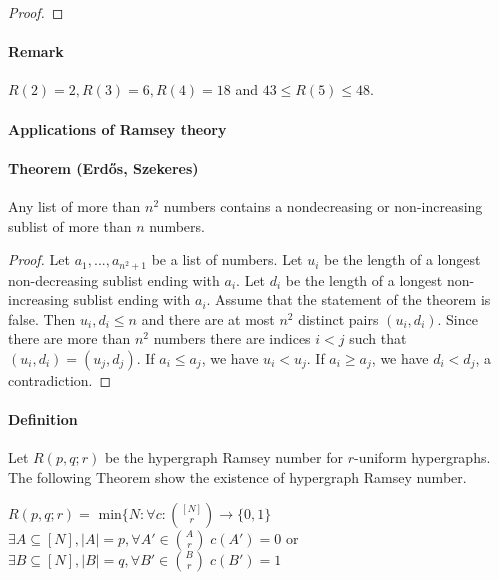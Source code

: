 \begin{proof}
\end{proof}

\paragraph{Remark}
$R(2) = 2, R(3) = 6, R(4) = 18$ and $43 \leq R(5) \leq 48$.

\paragraph{Applications of Ramsey theory}

\paragraph{Theorem (Erd\H{o}s, Szekeres)} Any list of more than $n^2$ numbers 
contains a nondecreasing or non-increasing sublist of more than $n$ numbers.
\begin{proof}
    Let $a_1,...,a_{n^2 + 1}$ be a list of numbers. Let $u_i$ be the length of 
    a longest non-decreasing sublist ending with $a_i$. Let $d_i$ be the 
    length of a longest non-increasing sublist ending with $a_i$. Assume 
    that the statement of the theorem is false. Then $u_i, d_i \leq n$ and 
    there are at most $n^2$ distinct pairs $(u_i,d_i)$. Since there are more 
    than $n^2$ numbers there are indices $i < j$ such that 
    $(u_i,d_i) = (u_j,d_j)$. If $a_i \leq a_j$, we have $u_i < u_j$. 
    If $a_i \geq a_j$, we have $d_i < d_j$, a contradiction.
\end{proof}

\paragraph{Definition}
Let $R(p,q;r)$ be the hypergraph Ramsey number for $r$-uniform hypergraphs.
The following Theorem show the existence of hypergraph Ramsey number.
\begin{center}
    $R(p,q;r) =$ min$\{N: \forall c: \binom{[N]}{r} \to \{0,1\}$ \\
    $\exists A \subseteq [N], |A| = p, \forall A' \in \binom{A}{r}\; c(A') = 0$
    or \\
    $\exists B \subseteq [N], |B| = q, \forall B' \in \binom{B}{r}\; c(B') = 1$
\end{center}

